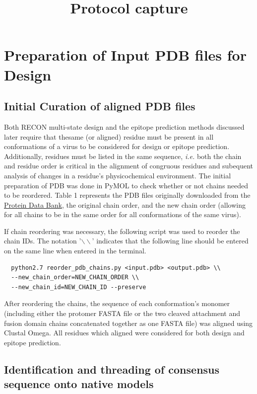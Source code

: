 \documentclass[10pt]{article}
\title{Protocol capture}
\date{}
\begin{document}
\maketitle
\thispagestyle{empty}

\section{Preparation of Input PDB files for Design}

\subsection{Initial Curation of aligned PDB files}

Both RECON multi-state design and the epitope prediction methods discussed later require that thesame (or aligned) residue must be present in all conformations of a virus to be considered for design or epitope prediction. Additionally, residues must be listed in the same sequence, \textit{i.e.} both the chain and residue order is critical in the alignment of congruous residues and subequent analysis of changes in a residue's physicochemical environment. The initial preparation of PDB was done in PyMOL to check whether or not chains needed to be reordered. Table 1 represents the PDB files originally downloaded from the \href{www.rcsb.org}{Protein Data Bank}, the original chain order, and the new chain order (allowing for all chains to be in the same order for all conformations of the same virus).

If chain reordering was necessary, the following script was used to reorder the chain IDs. The notation '\texttt{$\backslash\backslash$}' indicates that the following line should be entered on the same line when entered in the terminal.
\begin{lstlisting}
  python2.7 reorder_pdb_chains.py <input.pdb> <output.pdb> \\
  --new_chain_order=NEW_CHAIN_ORDER \\
  --new_chain_id=NEW_CHAIN_ID --preserve
\end{lstlisting}

After reordering the chains, the sequence of each conformation's monomer (including either the protomer FASTA file or the two cleaved attachment and fusion domain chains concatenated together as one FASTA file) was aligned using Clustal Omega. All residues which aligned were considered for both design and epitope prediction.

\subsection{Identification and threading of consensus sequence onto native models}\label{sec:msa}
\end{document}
